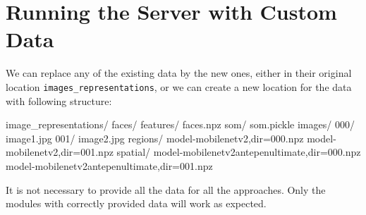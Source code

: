 \section{Running the Server with Custom Data}
\label{s:dir_structure}

We can replace any of the existing data by the new ones, either in their original location \verb+images_representations+, or we can create a new location for the data with following structure:


\vspace{0.5cm}
\begin{boxedverbatim}
image_representations/
    faces/
        features/
            faces.npz
        som/
            som.pickle
    images/
        000/
            image1.jpg
        001/
            image2.jpg
    regions/
        model-mobilenetv2,dir=000.npz
        model-mobilenetv2,dir=001.npz
    spatial/
        model-mobilenetv2antepenultimate,dir=000.npz
        model-mobilenetv2antepenultimate,dir=001.npz
\end{boxedverbatim}
\vspace{0.5cm}

It is not necessary to provide all the data for all the approaches. Only the modules with correctly provided data will work as expected.

